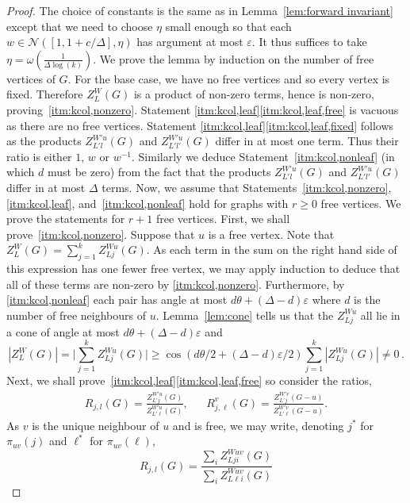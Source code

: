 \documentclass[10pt,a4paper]{article}
\theoremstyle{definition}
\newcommand*{\eps}{\varepsilon}
\begin{document}
\begin{proof}
The choice of constants is the same as in Lemma~\ref{lem:forward invariant} except that we need to choose $\eta$ small enough so that each $w\in \mathcal{N}([1,1+c/\Delta],\eta)$ has argument at most $\eps$. It thus suffices to take $\eta=\omega(\frac{1}{\Delta\log(k)})$.
%
We prove the lemma by induction on the number of free vertices of $G$.
For the base case, we have no free vertices and so every vertex is fixed.
Therefore $Z_L^W(G)$ is a product of non-zero terms, hence is non-zero, proving~\ref{itm:kcol,nonzero}.
Statement \ref{itm:kcol,leaf}\ref{itm:kcol,leaf,free} is vacuous as there are no free vertices.
Statement \ref{itm:kcol,leaf}\ref{itm:kcol,leaf,fixed} follows as the products $Z_{L'l}^{W'u}(G)$ and $Z_{L'l'}^{W'u}(G)$ differ in at most one term.
Thus their ratio is either $1$, $w$ or $w^{-1}$.
Similarly we deduce Statement~\ref{itm:kcol,nonleaf} (in which $d$ must be zero) from the fact that the products $Z_{L'l}^{W'u}(G)$ and $Z_{L'l'}^{W'u}(G)$ differ in at most $\Delta$ terms.
%
Now, we assume that Statements~\ref{itm:kcol,nonzero}, \ref{itm:kcol,leaf}, and~\ref{itm:kcol,nonleaf} hold for graphs with $r \ge 0$ free vertices. We prove the statements for $r+1$ free vertices. First, we shall prove~\ref{itm:kcol,nonzero}.
%
Suppose that $u$ is a free vertex.
Note that $Z_L^W(G) = \sum_{j=1}^k Z_{Lj}^{Wu}(G)$.
As each term in the sum on the right hand side of this expression has one fewer free vertex, we may apply induction to deduce that all of these terms are non-zero by \ref{itm:kcol,nonzero}.
Furthermore, by \ref{itm:kcol,nonleaf} each pair has angle at most $d\theta +(\Delta-d)\eps$ where $d$ is the number of free neighbours of $u$.
Lemma~\ref{lem:cone} tells us that the $Z_{Lj}^{Wu}$ all lie in a cone of angle at most $d\theta+(\Delta-d)\eps$ and
\begin{equation*}
 |Z_L^W(G)| = \bigg|\sum_{j=1}^k Z_{Lj}^{Wu}(G) \bigg| \geq \cos(d\theta/2+(\Delta-d)\eps/2)\sum_{j=1}^k |Z_{Lj}^{Wu}(G)| \neq 0\,.
\end{equation*}
%
Next, we shall prove~\ref{itm:kcol,leaf}\ref{itm:kcol,leaf,free} so consider the ratios,
\begin{align*}
 R_{j,l}(G) = \frac{Z_{L'j}^{W'u}(G)}{Z_{L'\ell}^{W'u}(G)}, & & R_{j,\ell}^v(G) = \frac{Z_{L'j}^{W'v}(G- u)}{Z_{L'\ell}^{W'v}(G - u)}.
\end{align*}
As $v$ is the unique neighbour of $u$ and is free, we may write, denoting $j^*$ for $\pi_{uv}(j)$ and $\ell^*$ for $\pi_{uv}(\ell)$,
\[
 R_{j,l}(G) = \frac{\sum_{i}Z^{Wuv}_{Lji}(G)}{\sum_{i}Z^{Wuv}_{L\ell i}(G)}
\]
\end{proof}
\end{document}
